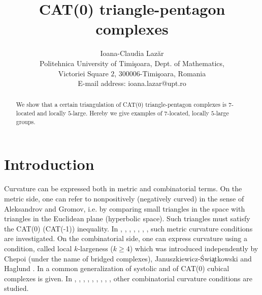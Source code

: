 \documentclass{amsart}
\author{}
\theoremstyle{definition}
\theoremstyle{remark}
\numberwithin{equation}{section}
\begin{document}
\title{CAT(0) triangle-pentagon complexes}


\author[Ioana-Claudia Laz\u{a}r]{
Ioana-Claudia Laz\u{a}r\\
Politehnica University of Timi\c{s}oara, Dept. of Mathematics,\\
Victoriei Square $2$, $300006$-Timi\c{s}oara, Romania\\
E-mail address: ioana.lazar@upt.ro}


\begin{abstract}
We show that a certain triangulation of CAT(0) triangle-pentagon complexes is $7$-located and locally $5$-large.
Hereby we give examples of $7$-located, locally $5$-large groups. 

\end{abstract}

\maketitle

\section{Introduction}


Curvature can be expressed both in metric and combinatorial terms. On the metric side, one can refer to nonpositively  (negatively curved) in the sense of Aleksandrov and Gromov,
i.e. by comparing small triangles in the space with triangles in the Euclidean plane (hyperbolic space). Such triangles must satisfy the CAT(0) (CAT(-1))  inequality. In   \cite{Gr}, \cite{BH}, \cite{Ch}, \cite{Ch08}, \cite{crowley_2008}, \cite{AB}, \cite{AF}, \cite{GG} such metric curvature conditions are investigated. On the combinatorial side, one can express curvature 
using a condition, called local $k$-largeness ($k \geq 4$) which was introduced independently by Chepoi \cite{Ch} (under the name of bridged complexes), Januszkiewicz-{\' S}wi{\c a}tkowski \cite{JS1} and Haglund \cite{Hag}.
In \cite{BCCGO} a common generalization of systolic
and of CAT(0) cubical complexes is given. 
In \cite{CCGHO}, \cite{CCHO}, \cite{O-sdn}, \cite{ChOs}, \cite{O-8loc}, \cite{H}, \cite{HL}, \cite{L-8loc}, \cite{L-8loc2}, \cite{CCG} other combinatorial curvature conditions are studied. 

 
\end{document}
